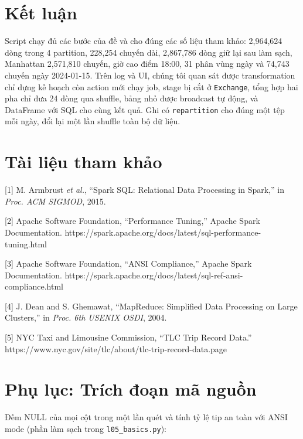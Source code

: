 \documentclass[
  12pt,
  a4paper,
]{report}
\begin{document}
\section{Kết luận}\label{sec:l05-conclusion}

Script chạy đủ các bước của đề và cho đúng các số liệu tham khảo:
2,964,624 dòng trong 4 partition, 228,254 chuyến dài, 2,867,786 dòng giữ
lại sau làm sạch, Manhattan 2,571,810 chuyến, giờ cao điểm 18:00, 31
phân vùng ngày và 74,743 chuyến ngày 2024-01-15. Trên log và UI, chúng
tôi quan sát được transformation chỉ dựng kế hoạch còn action mới chạy
job, stage bị cắt ở \texttt{Exchange}, tổng hợp hai pha chỉ đưa 24 dòng
qua shuffle, bảng nhỏ được broadcast tự động, và DataFrame với SQL cho
cùng kết quả. Ghi có \texttt{repartition} cho đúng một tệp mỗi ngày, đổi
lại một lần shuffle toàn bộ dữ liệu.

\section*{Tài liệu tham khảo}\label{tuxe0i-liux1ec7u-tham-khux1ea3o-4}

{[}1{]} M. Armbrust \emph{et al.}, ``Spark SQL: Relational Data
Processing in Spark,'' in \emph{Proc. ACM SIGMOD}, 2015.

{[}2{]} Apache Software Foundation, ``Performance Tuning,'' Apache Spark
Documentation.
https://spark.apache.org/docs/latest/sql-performance-tuning.html

{[}3{]} Apache Software Foundation, ``ANSI Compliance,'' Apache Spark
Documentation.
https://spark.apache.org/docs/latest/sql-ref-ansi-compliance.html

{[}4{]} J. Dean and S. Ghemawat, ``MapReduce: Simplified Data Processing
on Large Clusters,'' in \emph{Proc. 6th USENIX OSDI}, 2004.

{[}5{]} NYC Taxi and Limousine Commission, ``TLC Trip Record Data.''
https://www.nyc.gov/site/tlc/about/tlc-trip-record-data.page

\section*{Phụ lục: Trích đoạn mã
nguồn}\label{phux1ee5-lux1ee5c-truxedch-ux111oux1ea1n-muxe3-nguux1ed3n-2}

Đếm NULL của mọi cột trong một lần quét và tính tỷ lệ tip an toàn với
ANSI mode (phần làm sạch trong \texttt{l05\_basics.py}):
\end{document}
